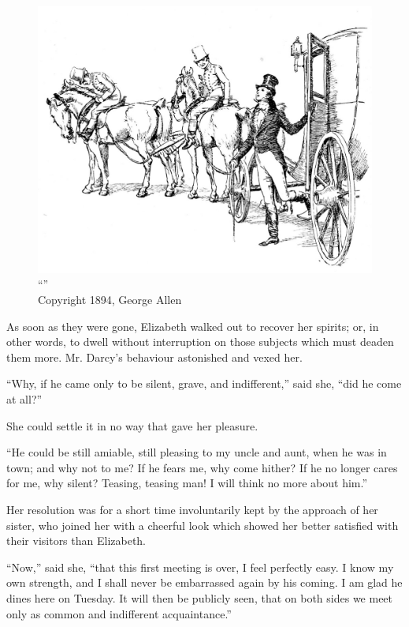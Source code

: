 \begin{figure}[htbp]
    \centering
    \includegraphics[width=\textwidth]{illustrations/i_031.jpg}
    \caption{“”\\ Copyright 1894, George Allen}
    \label{fig:image}
\end{figure}


As soon as they were gone, Elizabeth walked out to recover her spirits; or, in other words, to dwell without interruption on those subjects which must deaden them more. Mr. Darcy's behaviour astonished and vexed her.

``Why, if he came only to be silent, grave, and indifferent,'' said she, ``did he come at all?''

She could settle it in no way that gave her pleasure.

``He could be still amiable, still pleasing to my uncle and aunt, when he was in town; and why not to me? If he fears me, why come hither? If he no longer cares for me, why silent? Teasing, teasing man! I will think no more about him.''

Her resolution was for a short time involuntarily kept by the approach of her sister, who joined her with a cheerful look which showed her better satisfied with their visitors than Elizabeth.

``Now,'' said she, ``that this first meeting is over, I feel perfectly easy. I know my own strength, and I shall never be embarrassed again by his coming. I am glad he dines here on Tuesday. It will then be publicly seen, that on both sides we meet only as common and indifferent acquaintance.''

